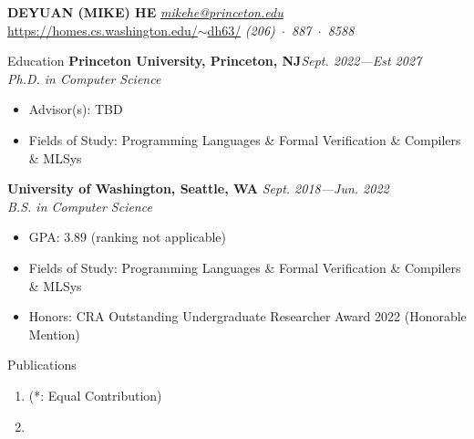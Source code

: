 \documentclass{resume}
\begin{document}
\vspace{-0.5in}

	\MakeUppercase{\Large{\textbf{Deyuan (Mike) He}}} \hfill {\em{\href{mailto:mikehe@princeton.edu}{mikehe@princeton.edu}}}\\
	\vspace{-5pt}\href{https://homes.cs.washington.edu/~dh63/}{https://homes.cs.washington.edu/$\sim$dh63/} \hfill{\em (206)~$\cdot$~887~$\cdot$~8588}

	\begin{rSection}{Education}
    {\bf Princeton University, Princeton, NJ}\hfill {\em Sept. 2022---Est 2027} \\
    \textit{Ph.D. in Computer Science}
    \vspace{-5pt}
    \begin{itemize}[leftmargin=*]
        \setlength{\itemsep}{1pt}
        \setlength{\parskip}{0pt}
        \setlength{\parsep}{0pt}
        \item Advisor(s): TBD
        \item Fields of Study: Programming Languages \& Formal Verification \& Compilers \& MLSys
    \end{itemize}
	{\bf University of Washington, Seattle, WA} \hfill {\em Sept. 2018---Jun. 2022} \\
	\textit{B.S. in Computer Science}
	\vspace{-5pt}
        \begin{itemize}[leftmargin=*]
            \setlength{\itemsep}{1pt}
            \setlength{\parskip}{0pt}
			\setlength{\parsep}{0pt}
			\item GPA: 3.89 (ranking not applicable)
            \item Fields of Study: Programming Languages \& Formal Verification \& Compilers \& MLSys
            \item Honors: CRA Outstanding Undergraduate Researcher Award 2022 (Honorable Mention)
		\end{itemize}
	\end{rSection}
	\vspace{-5pt}
    \begin{rSection}{Publications}
		\begin{enumerate}
			\setlength{\itemsep}{1pt}
            \setlength{\parskip}{0pt}
			\setlength{\parsep}{0pt}
			\item {} (\small{*: Equal Contribution})
			\item {}
		\end{enumerate}
        \vspace{-5pt}
	\end{rSection}
\end{document}
